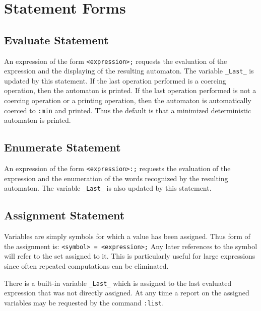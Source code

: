 \section{Statement Forms}
\subsection{Evaluate Statement}
An expression of the form
\verb#<expression>;#
requests the evaluation of the expression and the displaying of the
resulting automaton.
The variable \verb#_Last_# is updated by this statement.
If the last operation performed is a coercing operation, then the automaton
is printed.
If the last operation performed is not a coercing operation or a printing
operation, then the automaton is automatically coerced to \verb#:min# and
printed.
Thus the default is that a minimized deterministic automaton is printed.

\subsection{Enumerate Statement}
An expression of the form
\verb#<expression>:;#
requests the evaluation of the expression and the enumeration of the words
recognized by the resulting automaton.
The variable \verb#_Last_# is also updated by this statement.

\subsection{Assignment Statement}
Variables are simply symbols for which a value has been assigned.
Thus form of the assignment is:
\verb#<symbol> = <expression>;#
Any later references to the symbol will refer to the set assigned to it.
This is particularly useful for large expressions since often repeated
computations can be eliminated.

There is a built-in variable \verb#_Last_# which is assigned to the
last evaluated expression that was not directly assigned.
At any time a report on the assigned variables may be requested by the
command \verb#:list#.

